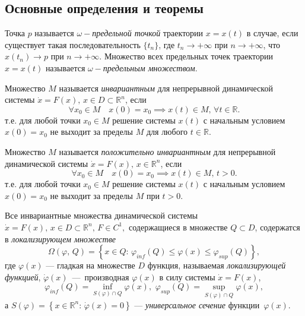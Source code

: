 \documentclass[14pt,a4paper]{extarticle}
\begin{document}
	\subsection{Основные определения и теоремы}
	
	\begin{definition}
		Точка $p$ называется \textit{$\omega-$предельной точкой} траектории $x=x(t)$ в случае, если существует такая последовательность $\{t_n\}$, где $t_n\rightarrow+\infty$ при $n\rightarrow+\infty$, что $x(t_n)\rightarrow p$ при $n\rightarrow+\infty$. Множество всех предельных точек траектории $x=x(t)$ называется \textit{$\omega-$предельным множеством}.
	\end{definition}
	
	\begin{definition}
		Множество $M$ называется \textit{инвариантным} для непрерывной динамической системы $\dot{x} = F(x),\, x\in D\subset\mathbb{R}^n$, если 
		\[\forall{}x_0\in{}M\quad x(0)=x_0\implies{}x(t)\in{}M,\,\forall{}t\in\mathbb{R}.\]
		т.е. для любой точки $x_0\in M$ решение системы $x(t)$ с начальным условием $x(0)=x_0$ не выходит за пределы $M$ для любого $t\in\mathbb{R}$.
	\end{definition}
	
	\begin{definition}
		Множество $M$ называется \textit{положительно инвариантным} для непрерывной динамической системы $\dot{x} = F(x),\, x\in\mathbb{R}^n$, если 
		\[\forall{}x_0\in{}M\quad x(0)=x_0\implies{}x(t)\in{}M,\, t>0.\]
		т.е. для любой точки $x_0\in M$ решение системы $x(t)$ с начальным условием $x(0)=x_0$ не выходит за пределы $M$ при $t>0$.
	\end{definition}
	
	\begin{theorem}\cite{invar_comp}
		Все инвариантные множества динамической системы $\dot{x} = F(x),\, x\in D\subset\mathbb{R}^n,\, F\in C^1,$ содержащиеся в множестве $Q\subset D$, содержатся в \textit{локализирующем множестве}
		\[\Omega(\varphi,\, Q) = \left\{x\in Q:\, \varphi_{inf}(Q)\le \varphi(x) \le \varphi_{sup}(Q)\right\},\]
		где $\varphi(x)$ --- гладкая на множестве $D$ функция, называемая \textit{локализирующей функцией}, $\dot{\varphi}(x)$~---~производная $\varphi(x)$ в силу системы $\dot{x}=F(x)$,
		\[\varphi_{inf}(Q) = \inf\limits_{S(\varphi)\cap Q}\varphi(x),\,\,\varphi_{sup}(Q) = \sup\limits_{S(\varphi)\cap Q}\varphi(x),\]
		а $S(\varphi) = \left\{x\in\mathbb{R}^n:\, \dot{\varphi}(x)=0\right\}$ --- \textit{универсальное сечение} функции~$\varphi(x)$.
	\end{theorem}
	
\end{document}
